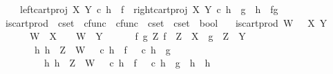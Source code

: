 \begin{isabellebody}
\ \ \ \ left{\isacharunderscore}{\kern0pt}cart{\isacharunderscore}{\kern0pt}proj\ X\ Y\ {\isasymcirc}\isactrlsub c\ h\ {\isacharequal}{\kern0pt}\ f\ {\isasymLongrightarrow}\ right{\isacharunderscore}{\kern0pt}cart{\isacharunderscore}{\kern0pt}proj\ X\ Y\ {\isasymcirc}\isactrlsub c\ h\ {\isacharequal}{\kern0pt}\ g\ {\isasymLongrightarrow}\ h\ {\isacharequal}{\kern0pt}\ {\isasymlangle}f{\isacharcomma}{\kern0pt}g{\isasymrangle}{\isachardoublequoteclose}\isanewline
\isanewline
{}\isamarkupfalse%
\ is{\isacharunderscore}{\kern0pt}cart{\isacharunderscore}{\kern0pt}prod\ {\isacharcolon}{\kern0pt}{\isacharcolon}{\kern0pt}\ {\isachardoublequoteopen}cset\ {\isasymRightarrow}\ cfunc\ {\isasymRightarrow}\ cfunc\ {\isasymRightarrow}\ cset\ {\isasymRightarrow}\ cset\ {\isasymRightarrow}\ bool{\isachardoublequoteclose}\ \isanewline
\ \ {\isachardoublequoteopen}is{\isacharunderscore}{\kern0pt}cart{\isacharunderscore}{\kern0pt}prod\ W\ {\isasympi}\ {\isasympi}\ X\ Y\ {\isasymlongleftrightarrow}\ \isanewline
\ \ \ \ {\isacharparenleft}{\kern0pt}{\isasympi}\ {\isacharcolon}{\kern0pt}\ W\ {\isasymrightarrow}\ X\ {\isasymand}\ {\isasympi}\ {\isacharcolon}{\kern0pt}\ W\ {\isasymrightarrow}\ Y\ {\isasymand}\isanewline
\ \ \ \ {\isacharparenleft}{\kern0pt}{\isasymforall}\ f\ g\ Z{\isachardot}{\kern0pt}\ {\isacharparenleft}{\kern0pt}f\ {\isacharcolon}{\kern0pt}\ Z\ {\isasymrightarrow}\ X\ {\isasymand}\ g\ {\isacharcolon}{\kern0pt}\ Z\ {\isasymrightarrow}\ Y{\isacharparenright}{\kern0pt}\ {\isasymlongrightarrow}\ \isanewline
\ \ \ \ \ \ {\isacharparenleft}{\kern0pt}{\isasymexists}\ h{\isachardot}{\kern0pt}\ h\ {\isacharcolon}{\kern0pt}\ Z\ {\isasymrightarrow}\ W\ {\isasymand}\ {\isasympi}\ {\isasymcirc}\isactrlsub c\ h\ {\isacharequal}{\kern0pt}\ f\ {\isasymand}\ {\isasympi}\ {\isasymcirc}\isactrlsub c\ h\ {\isacharequal}{\kern0pt}\ g\ {\isasymand}\isanewline
\ \ \ \ \ \ \ \ {\isacharparenleft}{\kern0pt}{\isasymforall}\ h{}{\isachardot}{\kern0pt}\ {\isacharparenleft}{\kern0pt}h{}\ {\isacharcolon}{\kern0pt}\ Z\ {\isasymrightarrow}\ W\ {\isasymand}\ {\isasympi}\ {\isasymcirc}\isactrlsub c\ h{}\ {\isacharequal}{\kern0pt}\ f\ {\isasymand}\ {\isasympi}\ {\isasymcirc}\isactrlsub c\ h{}\ {\isacharequal}{\kern0pt}\ g{\isacharparenright}{\kern0pt}\ {\isasymlongrightarrow}\ h{}\ {\isacharequal}{\kern0pt}\ h{\isacharparenright}{\kern0pt}{\isacharparenright}{\kern0pt}{\isacharparenright}{\kern0pt}{\isacharparenright}{\kern0pt}{\isachardoublequoteclose}\isanewline

\end{isabellebody}

